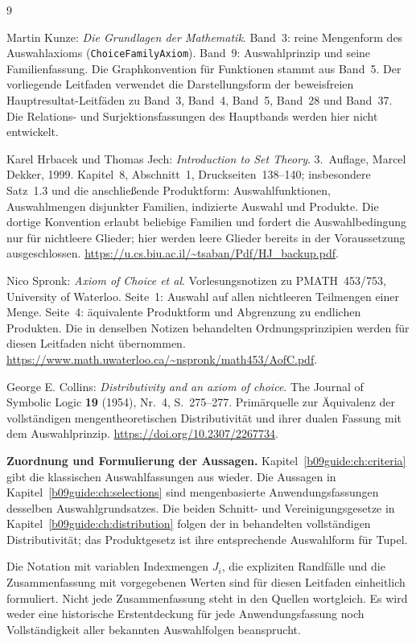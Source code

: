 \renewcommand{\bibname}{Quellen und Bandzuordnung}
\begin{thebibliography}{9}
\footnotesize
\setlength{\itemsep}{5pt}
\setlength{\parskip}{0pt}

Martin Kunze: \emph{Die Grundlagen der Mathematik}.
Band~3: reine Mengenform des Auswahlaxioms
(\texttt{ChoiceFamilyAxiom}).
Band~9: Auswahlprinzip und seine Familienfassung.
Die Graphkonvention für Funktionen stammt aus Band~5.
Der vorliegende Leitfaden verwendet die Darstellungsform der
beweisfreien Hauptresultat-Leitfäden zu Band~3, Band~4, Band~5,
Band~28 und Band~37. Die Relations- und Surjektionsfassungen
des Hauptbands werden hier nicht entwickelt.

Karel Hrbacek und Thomas Jech:
\emph{Introduction to Set Theory}. 3.~Auflage,
Marcel Dekker, 1999.
Kapitel~8, Abschnitt~1, Druckseiten~138--140;
insbesondere Satz~1.3 und die anschließende Produktform:
Auswahlfunktionen, Auswahlmengen disjunkter Familien,
indizierte Auswahl und Produkte.
Die dortige Konvention erlaubt beliebige Familien und
fordert die Auswahlbedingung nur für nichtleere Glieder;
hier werden leere Glieder bereits in der Voraussetzung ausgeschlossen.
\url{https://u.cs.biu.ac.il/~tsaban/Pdf/HJ_backup.pdf}.

Nico Spronk: \emph{Axiom of Choice et al}.
Vorlesungsnotizen zu PMATH~453/753, University of Waterloo.
Seite~1: Auswahl auf allen nichtleeren Teilmengen einer Menge.
Seite~4: äquivalente Produktform und Abgrenzung zu endlichen Produkten.
Die in denselben Notizen behandelten Ordnungsprinzipien werden
für diesen Leitfaden nicht übernommen.
\url{https://www.math.uwaterloo.ca/~nspronk/math453/AofC.pdf}.

George E. Collins: \emph{Distributivity and an axiom of choice}.
The Journal of Symbolic Logic \textbf{19} (1954), Nr.~4,
S.~275--277.
Primärquelle zur Äquivalenz der vollständigen mengentheoretischen
Distributivität und ihrer dualen Fassung mit dem Auswahlprinzip.
\url{https://doi.org/10.2307/2267734}.

\end{thebibliography}

\noindent\textbf{Zuordnung und Formulierung der Aussagen.}
Kapitel~\ref{b09guide:ch:criteria} gibt die klassischen
Auswahlfassungen aus \cite{hrbacek,spronk} wieder.
Die Aussagen in Kapitel~\ref{b09guide:ch:selections}
sind mengenbasierte Anwendungsfassungen desselben Auswahlgrundsatzes.
Die beiden Schnitt- und Vereinigungsgesetze in
Kapitel~\ref{b09guide:ch:distribution} folgen der in
\cite{collins} behandelten vollständigen Distributivität;
das Produktgesetz ist ihre entsprechende Auswahlform für Tupel.

Die Notation mit variablen Indexmengen $J_i$, die expliziten
Randfälle und die Zusammenfassung mit vorgegebenen Werten
sind für diesen Leitfaden einheitlich formuliert.
Nicht jede Zusammenfassung steht in den Quellen wortgleich.
Es wird weder eine historische Erstentdeckung für jede
Anwendungsfassung noch Vollständigkeit aller bekannten
Auswahlfolgen beansprucht.
